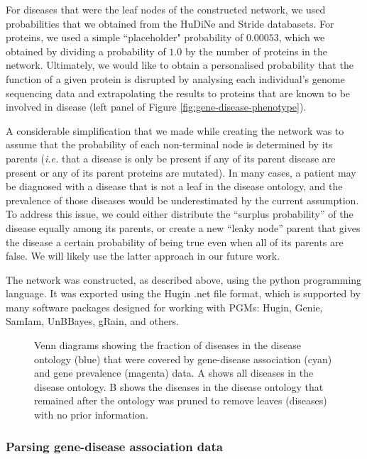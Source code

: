 \documentclass[11pt]{article}
\begin{document}
For diseases that were the leaf nodes of the constructed network, we used probabilities that we obtained from the HuDiNe and Stride databasets. For proteins, we used a simple ``placeholder" probability of $0.00053$, which we obtained by dividing a probability of $1.0$ by the number of proteins in the network. Ultimately, we would like to obtain a personalised probability that the function of a given protein is disrupted by analysing each individual's genome sequencing data and extrapolating the results to proteins that are known to be involved in disease (left panel of Figure \ref{fig:gene-disease-phenotype}).

A considerable simplification that we made while creating the network was to assume that the probability of each non-terminal node is determined by its parents (\textit{i.e.} that a disease is only be present if any of its parent disease are present or any of its parent proteins are mutated). In many cases, a patient may be diagnosed with a disease that is not a leaf in the disease ontology, and the prevalence of those diseases would be underestimated by the current assumption. To address this issue, we could either distribute the ``surplus probability'' of the disease equally among its parents, or create a new ``leaky node'' parent that gives the disease a certain probability of being true even when all of its parents are false. We will likely use the latter approach in our future work.

The network was constructed, as described above, using the python programming language. It was exported using the Hugin .net file format, which is supported by many software packages designed for working with PGMs: Hugin, Genie, SamIam, UnBBayes, gRain, and others.


\begin{figure} %
\centering
\caption{Venn diagrams showing the fraction of diseases in the disease ontology (blue) that were covered by gene-disease association (cyan) and gene prevalence (magenta) data. A shows all diseases in the disease ontology. B shows the diseases in the disease ontology that remained after the ontology was pruned to remove leaves (diseases) with no prior information.}
\label{fig:venn_diagrams}
\end{figure}



\subsubsection{Parsing gene-disease association data}
\end{document}
